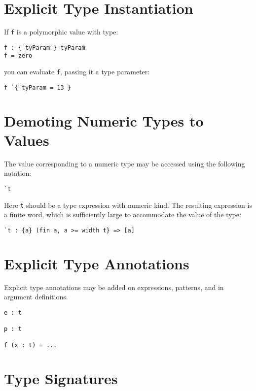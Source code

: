 \section{Explicit Type Instantiation}\label{explicit-type-instantiation}

If \texttt{f} is a polymorphic value with type:

\begin{verbatim}
f : { tyParam } tyParam
f = zero
\end{verbatim}

you can evaluate \texttt{f}, passing it a type parameter:

\begin{verbatim}
f `{ tyParam = 13 }
\end{verbatim}

\section{Demoting Numeric Types to
Values}\label{demoting-numeric-types-to-values}

The value corresponding to a numeric type may be accessed using the
following notation:

\begin{verbatim}
`t
\end{verbatim}

Here \texttt{t} should be a type expression with numeric kind. The
resulting expression is a finite word, which is sufficiently large to
accommodate the value of the type:

\begin{verbatim}
`t : {a} (fin a, a >= width t} => [a]
\end{verbatim}

\section{Explicit Type Annotations}\label{explicit-type-annotations}

Explicit type annotations may be added on expressions, patterns, and in
argument definitions.

\begin{verbatim}
e : t

p : t

f (x : t) = ...
\end{verbatim}

\section{Type Signatures}\label{type-signatures}

